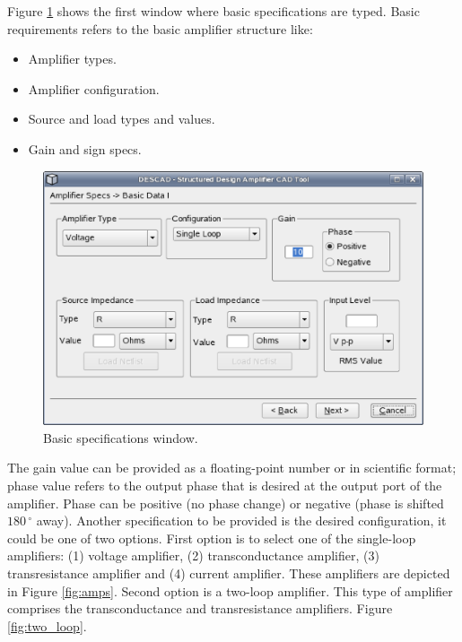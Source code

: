 \documentclass[twocolumn]{IEEEtran}
\begin{document}
Figure \ref{fig:des1} shows the first window where basic specifications are typed. Basic requirements refers to the basic amplifier structure like:

\begin{itemize}
\item Amplifier types.
\item Amplifier configuration.
\item Source and load types and values.
\item Gain and sign specs.
\end{itemize}

\begin{figure}[hbtp]
	\centering
	\includegraphics[scale=0.3]{figures/step1.eps}
	\caption{Basic specifications window.}
	\label{fig:des1}
\end{figure}

The gain value can be provided as a floating-point number or in scientific format; phase value refers to the output phase that is desired at the output port of the amplifier. Phase can be positive (no phase change) or negative (phase is shifted $180\,^{\circ}$ away). Another specification to be provided is the desired configuration, it could be one of two options. First option is to select one of the single-loop amplifiers: (1) voltage amplifier, (2) transconductance amplifier, (3) transresistance amplifier and (4) current amplifier. These amplifiers are depicted in Figure \ref{fig:amps}. Second option is a two-loop amplifier. This type of amplifier comprises the transconductance and transresistance amplifiers. Figure \ref{fig:two_loop}.
\end{document}
